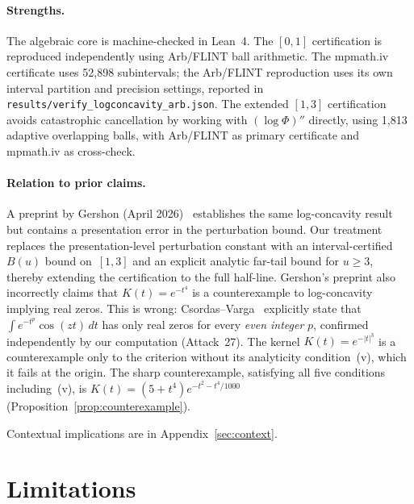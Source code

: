 \documentclass[11pt]{article}
\theoremstyle{definition}
\theoremstyle{remark}
\begin{document}
\paragraph{Strengths.}
The algebraic core is machine-checked in Lean~4.
The $[0,1]$ certification is reproduced independently using Arb/FLINT ball arithmetic.
The mpmath.iv certificate uses 52{,}898 subintervals; the Arb/FLINT reproduction
uses its own interval partition and precision settings, reported in
\texttt{results/verify\_logconcavity\_arb.json}.
The extended $[1,3]$ certification avoids catastrophic cancellation by
working with $(\log\Phi)''$ directly, using 1{,}813 adaptive overlapping
balls, with Arb/FLINT as primary certificate and
mpmath.iv as cross-check.

\paragraph{Relation to prior claims.}
A preprint by Gershon (April 2026)~\cite{gershon2026} establishes the same
log-concavity result but contains a presentation error in the perturbation bound.
Our treatment replaces the presentation-level perturbation constant with an
interval-certified $B(u)$ bound on~$[1,3]$ and an explicit analytic far-tail bound
for $u\ge3$, thereby extending the certification to the full half-line.
Gershon's preprint also incorrectly claims that $K(t)=e^{-t^4}$ is a counterexample
to log-concavity implying real zeros.
This is wrong: Csordas--Varga~\cite[Ex.~2.1]{csordas1989} explicitly state that
$\int e^{-t^p}\cos(zt)\,dt$ has only real zeros for every \emph{even integer} $p$,
confirmed independently by our computation (Attack~27).
The kernel $K(t)=e^{-|t|^3}$ is a counterexample only to the criterion
without its analyticity condition~(v), which it fails at the origin.
The sharp counterexample, satisfying all five conditions including~(v),
is $K(t) = (5+t^4)e^{-t^2-t^4/1000}$ (Proposition~\ref{prop:counterexample}).

Contextual implications are in Appendix~\ref{sec:context}.

\section{Limitations}
\label{sec:limitations}
\end{document}

